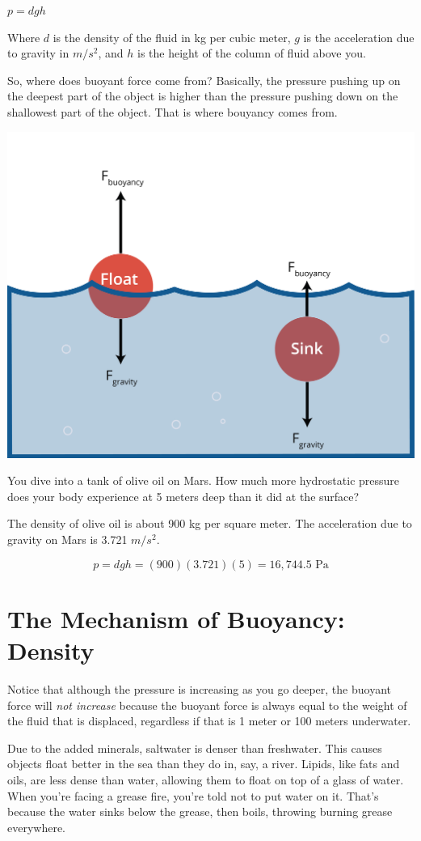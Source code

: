 $p = d g h$

Where  $d$ is the density of the fluid
in kg per cubic meter, $g$ is the acceleration due to gravity in
$m/s^2$, and $h$ is the height of the column of fluid above you.

So, where does buoyant force come from? Basically, the pressure pushing up on the
deepest part of the object is higher than the pressure pushing down on
the shallowest part of the object. That is where bouyancy comes from.

\includegraphics[width=.6\textwidth]{buoyancy.png}

\begin{Exercise}[title={Hydrostatic Pressure}, label=mars_pressure]

  You dive into a tank of olive oil on Mars. How much more
  hydrostatic pressure does your body experience at 5 meters deep than
  it did at the surface?

  The density of olive oil is about 900 kg per square meter. The
  acceleration due to gravity on Mars is 3.721 $m/s^2$.

\end{Exercise}
\begin{Answer}[ref=mars_pressure]
$$p = d g h = (900)(3.721)(5) = 16,744.5 \text{ Pa}$$
\end{Answer}

\section{The Mechanism of Buoyancy: Density}
Notice that although the pressure is increasing as you go deeper, the
buoyant force will \emph{not increase} because the buoyant force is always equal
to the weight of the fluid that is displaced, regardless if that is 1
meter or 100 meters underwater.

Due to the added minerals, saltwater is denser than freshwater. This causes objects float
better in the sea than they do in, say, a river. Lipids, like fats and
oils, are less dense than water, allowing them to float on top of a glass of water.
When you're facing a grease fire, you're told not to put water on it. That's because
the water sinks below the grease, then boils, throwing burning grease everywhere.
